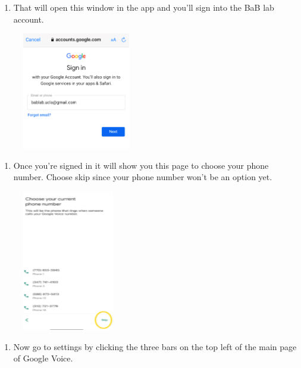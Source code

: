 \documentclass[]{book}
\providecommand{\tightlist}{%
  \setlength{\itemsep}{0pt}\setlength{\parskip}{0pt}}
\begin{document}
\begin{enumerate}
\def\labelenumi{\arabic{enumi})}
\setcounter{enumi}{2}
\tightlist
\item
  That will open this window in the app and you'll sign into the BaB lab account.
\end{enumerate}

\begin{figure}
\centering
\includegraphics{images/research_protocols/google_voice/pic3.png}
\caption{}
\end{figure}

\begin{enumerate}
\def\labelenumi{\arabic{enumi})}
\setcounter{enumi}{3}
\tightlist
\item
  Once you're signed in it will show you this page to choose your phone number. Choose skip since your phone number won't be an option yet.
\end{enumerate}

\begin{figure}
\centering
\includegraphics{images/research_protocols/google_voice/pic4.png}
\caption{}
\end{figure}

\begin{enumerate}
\def\labelenumi{\arabic{enumi})}
\setcounter{enumi}{4}
\tightlist
\item
  Now go to settings by clicking the three bars on the top left of the main page of Google Voice.
\end{enumerate}
\end{document}
